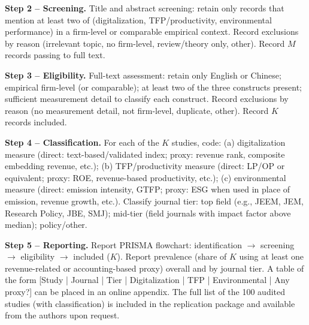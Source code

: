 \documentclass[3p,times,sort&compress]{elsarticle}
\begin{document}
\textbf{Step 2 -- Screening.} Title and abstract screening: retain only records that mention at least two of (digitalization, TFP/productivity, environmental performance) in a firm-level or comparable empirical context. Record exclusions by reason (irrelevant topic, no firm-level, review/theory only, other). Record $M$ records passing to full text.

\textbf{Step 3 -- Eligibility.} Full-text assessment: retain only English or Chinese; empirical firm-level (or comparable); at least two of the three constructs present; sufficient measurement detail to classify each construct. Record exclusions by reason (no measurement detail, not firm-level, duplicate, other). Record $K$ records included.

\textbf{Step 4 -- Classification.} For each of the $K$ studies, code: (a) digitalization measure (direct: text-based/validated index; proxy: revenue rank, composite embedding revenue, etc.); (b) TFP/productivity measure (direct: LP/OP or equivalent; proxy: ROE, revenue-based productivity, etc.); (c) environmental measure (direct: emission intensity, GTFP; proxy: ESG when used in place of emission, revenue growth, etc.). Classify journal tier: top field (e.g., JEEM, JEM, Research Policy, JBE, SMJ); mid-tier (field journals with impact factor above median); policy/other.

\textbf{Step 5 -- Reporting.} Report PRISMA flowchart: identification $\to$ screening $\to$ eligibility $\to$ included ($K$). Report prevalence (share of $K$ using at least one revenue-related or accounting-based proxy) overall and by journal tier. A table of the form [Study | Journal | Tier | Digitalization | TFP | Environmental | Any proxy?] can be placed in an online appendix. The full list of the 100 audited studies (with classification) is included in the replication package and available from the authors upon request.


\end{document}
